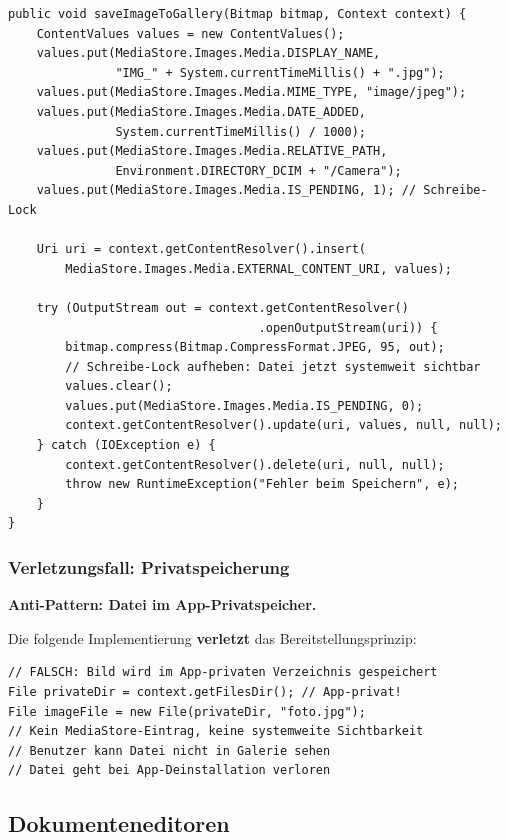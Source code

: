 ﻿\documentclass[12pt, a4paper]{article}
\begin{document}
\begin{lstlisting}[style=android, caption={Kamerabild korrekt an MediaStore uebergeben}]
public void saveImageToGallery(Bitmap bitmap, Context context) {
    ContentValues values = new ContentValues();
    values.put(MediaStore.Images.Media.DISPLAY_NAME,
               "IMG_" + System.currentTimeMillis() + ".jpg");
    values.put(MediaStore.Images.Media.MIME_TYPE, "image/jpeg");
    values.put(MediaStore.Images.Media.DATE_ADDED,
               System.currentTimeMillis() / 1000);
    values.put(MediaStore.Images.Media.RELATIVE_PATH,
               Environment.DIRECTORY_DCIM + "/Camera");
    values.put(MediaStore.Images.Media.IS_PENDING, 1); // Schreibe-Lock

    Uri uri = context.getContentResolver().insert(
        MediaStore.Images.Media.EXTERNAL_CONTENT_URI, values);

    try (OutputStream out = context.getContentResolver()
                                   .openOutputStream(uri)) {
        bitmap.compress(Bitmap.CompressFormat.JPEG, 95, out);
        // Schreibe-Lock aufheben: Datei jetzt systemweit sichtbar
        values.clear();
        values.put(MediaStore.Images.Media.IS_PENDING, 0);
        context.getContentResolver().update(uri, values, null, null);
    } catch (IOException e) {
        context.getContentResolver().delete(uri, null, null);
        throw new RuntimeException("Fehler beim Speichern", e);
    }
}
\end{lstlisting}

\subsubsection{Verletzungsfall: Privatspeicherung}

\noindent\textbf{Anti-Pattern: Datei im App-Privatspeicher.}\par
Die folgende Implementierung \textbf{verletzt} das Bereitstellungsprinzip:
\begin{lstlisting}[style=android, numbers=none]
// FALSCH: Bild wird im App-privaten Verzeichnis gespeichert
File privateDir = context.getFilesDir(); // App-privat!
File imageFile = new File(privateDir, "foto.jpg");
// Kein MediaStore-Eintrag, keine systemweite Sichtbarkeit
// Benutzer kann Datei nicht in Galerie sehen
// Datei geht bei App-Deinstallation verloren
\end{lstlisting}

\subsection{Dokumenteneditoren}
\end{document}
